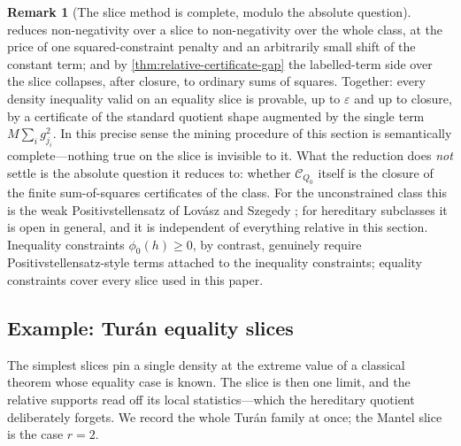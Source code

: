 \documentclass[11pt]{article}
\theoremstyle{definition}
\newtheorem{remark}[remark]{Remark}
\newcommand{\C}{\mathcal{C}}
\newcommand{\eps}{\varepsilon}
\begin{document}
\begin{remark}[The slice method is complete, modulo the absolute question]\label{rem:slice-complete}
 reduces non-negativity over a slice to
non-negativity over the whole class, at the price of one squared-constraint penalty and
an arbitrarily small shift of the constant term; and by
\cref{thm:relative-certificate-gap} the labelled-term side over the slice collapses,
after closure, to ordinary sums of squares.  Together: every density
inequality valid on an equality slice is provable, up to $\eps$ and up to closure, by a
certificate of the standard quotient shape augmented by the single term
$M\sum_ig_{j_i}^2$.  In this precise sense the mining procedure of this section is
semantically complete---nothing true on the slice is invisible to it.  What the
reduction does \emph{not} settle is the absolute question it reduces to: whether
$\C_{Q_0}$ itself is the closure of the finite sum-of-squares certificates of the
class.  For the unconstrained class this is the weak Positivstellensatz of
Lov\'asz and Szegedy \cite{LovaszSzegedy2012}; for hereditary subclasses it is open in
general, and it is independent of everything relative in this section.  Inequality
constraints $\phi_0(h)\ge0$, by contrast, genuinely require Positivstellensatz-style
terms attached to the inequality constraints; equality constraints cover every slice used
in this paper.
\end{remark}

\subsection{Example: Tur\'an equality slices}

The simplest slices pin a single density at the extreme value of a classical theorem
whose equality case is known.  The slice is then one limit, and the relative supports
read off its local statistics---which the hereditary quotient deliberately forgets.  We
record the whole Tur\'an family at once; the Mantel slice is the case $r=2$.
\end{document}
